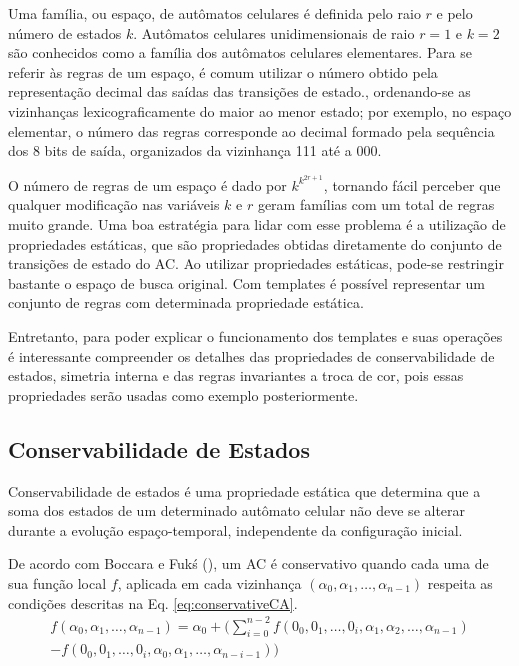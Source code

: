 \documentclass[12pt, a4paper]{article}
\begin{document}
Uma família, ou espaço, de autômatos celulares é definida pelo raio $r$ e pelo número de estados $k$. Autômatos celulares unidimensionais de raio $r=1$ e $k=2$ são conhecidos como a família dos autômatos celulares elementares. Para se referir às regras de um espaço, é comum utilizar o número obtido pela representação decimal das saídas das transições de estado., ordenando-se as vizinhanças lexicograficamente do maior ao menor estado; por exemplo, no espaço elementar, o número das regras corresponde ao decimal formado pela sequência dos 8 bits de saída, organizados da vizinhança 111 até a 000.

O número de regras de um espaço é dado por $k^{k^{2r+1}}$, tornando fácil perceber que qualquer modificação nas variáveis $k$ e $r$ geram famílias com um total de regras muito grande. Uma boa estratégia para lidar com esse problema é a utilização de propriedades estáticas, que são propriedades obtidas diretamente do conjunto de transições de estado do AC. Ao utilizar propriedades estáticas, pode-se restringir bastante o espaço de busca original. Com templates é possível representar um conjunto de regras com determinada propriedade estática.

Entretanto, para poder explicar o funcionamento dos templates e suas operações é interessante compreender os detalhes das propriedades de conservabilidade de estados, simetria interna e das regras invariantes a troca de cor, pois essas propriedades serão usadas como exemplo posteriormente.

\subsection{Conservabilidade de Estados}
Conservabilidade de estados é uma propriedade estática que determina que a soma dos estados de um determinado autômato celular não deve se alterar durante a evolução espaço-temporal, independente da configuração inicial.

De acordo com Boccara e Fukś (\citeyear{boccara2002}), um AC é conservativo quando cada uma de sua função local $f$, aplicada em cada vizinhança $(\alpha_0,\alpha_1, \dots, \alpha_{n-1})$ respeita as condições descritas na Eq. \eqref{eq:conservativeCA}.
\begin{equation}
\begin{split}
f(\alpha_0,\alpha_1, \dots,\alpha_{n-1}) = \alpha_0 + (\sum_{i=0}^{n-2}f(0_0,0_1, \dots,0_i,\alpha_1,\alpha_2, \dots,\alpha_{n-1}) \\- f(0_0,0_1, \dots,0_i,\alpha_0,\alpha_1, \dots,\alpha_{n-i-1}))
\label{eq:conservativeCA}
\end{split}
\end{equation}
\end{document}
